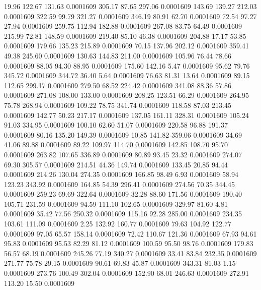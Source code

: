   19.96  122.67  131.63   0.0001609
 305.17   87.65  297.06   0.0001609
 143.69  139.27  212.03   0.0001609
 322.59   99.79  321.27   0.0001609
 346.19   80.91   62.70   0.0001609
  72.54   97.27   27.94   0.0001609
 259.75  112.94  182.88   0.0001609
 267.08   83.75   64.49   0.0001609
 215.99   72.81  148.59   0.0001609
 219.40   85.10   46.38   0.0001609
 204.88   17.17   53.85   0.0001609
 179.66  135.23  215.89   0.0001609
  70.15  137.96  202.12   0.0001609
 359.41   49.38  245.60   0.0001609
 130.63  144.83  211.00   0.0001609
 105.96   76.44   78.66   0.0001609
  88.05   94.30   88.95   0.0001609
 175.60  142.16    5.47   0.0001609
  95.62   79.76  345.72   0.0001609
 344.72   36.40    5.64   0.0001609
  76.63   81.31   13.64   0.0001609
  89.15  112.65  299.17   0.0001609
 279.50   68.52  224.42   0.0001609
 341.08   88.36   57.86   0.0001609
 271.08  108.00  133.00   0.0001609
 208.25  123.51   66.29   0.0001609
 264.95   75.78  268.94   0.0001609
 109.22   78.75  341.74   0.0001609
 118.58   87.03  213.45   0.0001609
 142.77   50.23  217.17   0.0001609
 137.05  161.11  328.31   0.0001609
 105.24   91.03  334.95   0.0001609
 100.10   62.60   51.07   0.0001609
 220.58   96.88  191.37   0.0001609
  80.16  135.20  149.39   0.0001609
  10.85  141.82  359.06   0.0001609
  34.69   41.06   89.88   0.0001609
  89.22  109.97  114.70   0.0001609
 142.85  108.70   95.70   0.0001609
 263.82  107.65  336.89   0.0001609
  80.89   93.45   23.32   0.0001609
 274.07   69.30  305.57   0.0001609
 214.51   44.36  149.74   0.0001609
 133.45   20.85   94.44   0.0001609
 214.26  130.04  274.35   0.0001609
 166.85   98.49    6.93   0.0001609
  58.94  123.23  343.92   0.0001609
 164.85   54.39  296.41   0.0001609
 274.56   70.35  344.45   0.0001609
 259.23   69.69  322.64   0.0001609
  32.28   88.60  171.56   0.0001609
 190.40  105.71  231.59   0.0001609
  94.59  111.10  102.65   0.0001609
 329.97   81.60    4.81   0.0001609
  35.42   77.56  250.32   0.0001609
 115.16   92.28  285.00   0.0001609
 234.35  103.61  111.09   0.0001609
   2.25  132.92  160.77   0.0001609
  79.63  104.92  122.77   0.0001609
  97.05   65.57  158.14   0.0001609
  72.42  110.67  121.36   0.0001609
  67.93   94.61   95.83   0.0001609
  95.53   82.29   81.12   0.0001609
 100.59   95.50   98.76   0.0001609
 179.83   56.57   68.19   0.0001609
 245.26   77.19  340.27   0.0001609
  33.41   83.84  232.35   0.0001609
 271.77   75.78   29.15   0.0001609
  90.61   69.83   45.87   0.0001609
 343.31   81.03    1.15   0.0001609
 273.76  100.49  302.04   0.0001609
 152.90   68.01  246.63   0.0001609
 272.91  113.20   15.50   0.0001609
